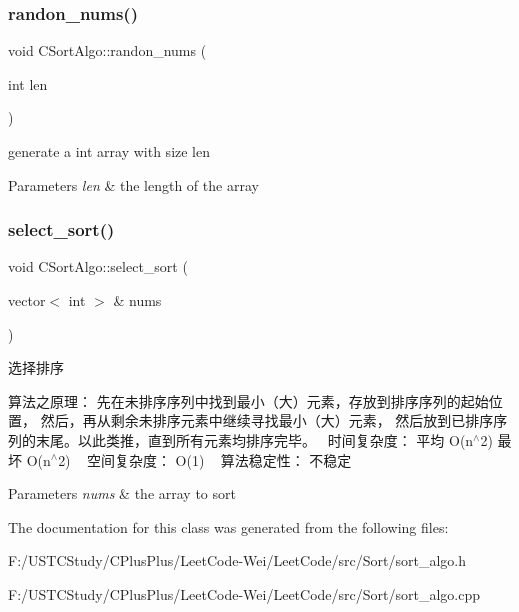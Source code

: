 \subsubsection{\texorpdfstring{randon\+\_\+nums()}{randon\_nums()}}
{\footnotesize\ttfamily void C\+Sort\+Algo\+::randon\+\_\+nums (\begin{DoxyParamCaption}\item[{int}]{len }\end{DoxyParamCaption})}

generate a int array with size len 
\begin{DoxyParams}{Parameters}
{\em len} & the length of the array \\
\hline
\end{DoxyParams}
\hypertarget{class_c_sort_algo_aeef7ae8fed73aa9997f4e2443fcfdf4b}{}\label{class_c_sort_algo_aeef7ae8fed73aa9997f4e2443fcfdf4b} 
\subsubsection{\texorpdfstring{select\+\_\+sort()}{select\_sort()}}
{\footnotesize\ttfamily void C\+Sort\+Algo\+::select\+\_\+sort (\begin{DoxyParamCaption}\item[{vector$<$ int $>$ \&}]{nums }\end{DoxyParamCaption})\hspace{0.3cm}{\ttfamily [private]}}



选择排序 

算法之原理： 先在未排序序列中找到最小（大）元素，存放到排序序列的起始位置， 然后，再从剩余未排序元素中继续寻找最小（大）元素， 然后放到已排序序列的末尾。以此类推，直到所有元素均排序完毕。~\newline
时间复杂度： 平均 O(n$^\wedge$2) 最坏 O(n$^\wedge$2) ~\newline
空间复杂度： O(1) ~\newline
算法稳定性： 不稳定 ~\newline

\begin{DoxyParams}{Parameters}
{\em nums} & the array to sort \\
\hline
\end{DoxyParams}


The documentation for this class was generated from the following files\+:\begin{DoxyCompactItemize}
\item 
F\+:/\+U\+S\+T\+C\+Study/\+C\+Plus\+Plus/\+Leet\+Code-\/\+Wei/\+Leet\+Code/src/\+Sort/sort\+\_\+algo.\+h\item 
F\+:/\+U\+S\+T\+C\+Study/\+C\+Plus\+Plus/\+Leet\+Code-\/\+Wei/\+Leet\+Code/src/\+Sort/sort\+\_\+algo.\+cpp\end{DoxyCompactItemize}
